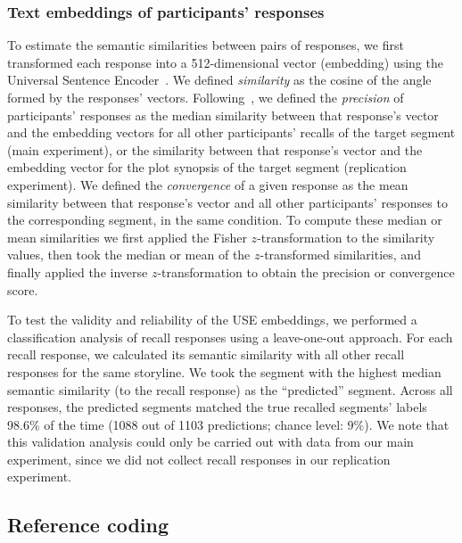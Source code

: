 \documentclass[10pt]{article}
\begin{document}
\subsubsection*{Text embeddings of participants' responses}

To estimate the semantic similarities between pairs of responses, we first transformed each response into a 512-dimensional vector (embedding) using the Universal Sentence Encoder~\citep[Transformer USE, ][]{CerEtal18}. We defined \textit{similarity} as the cosine of the angle formed by the responses' vectors. Following~\cite{HeusEtal21}, we defined the \textit{precision} of participants' responses as the median similarity between that response's vector and the embedding vectors for all other participants' recalls of the target segment (main experiment), or the similarity between that response's vector and the embedding vector for the plot synopsis of the target segment (replication experiment). We defined the \textit{convergence} of a given response as the mean similarity between that response's vector and all other participants' responses to the corresponding segment, in the same condition. To compute these median or mean similarities we first applied the Fisher $z$-transformation to the similarity values, then took the median or mean of the $z$-transformed similarities, and finally applied the inverse $z$-transformation to obtain the precision or convergence score.

To test the validity and reliability of the USE embeddings, we performed a classification analysis of recall responses using a leave-one-out approach. For each recall response, we calculated its semantic similarity with all other recall responses for the same storyline. We took the segment with the highest median semantic similarity (to the recall response) as the ``predicted'' segment. Across all responses, the predicted segments matched the true recalled segments' labels 98.6\% of the time (1088 out of 1103 predictions; chance level: 9\%). We note that this validation analysis could only be carried out with data from our main experiment, since we did not collect recall responses in our replication experiment.

\subsection*{Reference coding}
\end{document}
